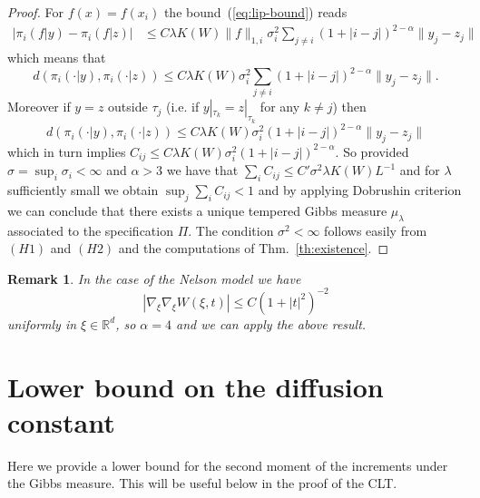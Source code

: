 \documentclass[a4paper,12pt,reqno]{amsart}
\newtheorem{remark}[theorem]{Remark}
\newcommand{\R}{\mathbb{R}}
\begin{document}
\begin{proof}
For $f(x) = f(x_i)$ the bound~(\ref{eq:lip-bound}) reads
\begin{equation*}
  \begin{split}
 \left|\pi_i(f|y)-\pi_i(f|z)\right| & \le 
 C \lambda K(W)  \|f\|_{1,i}  \sigma_i^2 \sum_{j \neq i} 
   (1+|i-j|)^{2-\alpha}  \|y_j-z_j\| 
  \end{split}
\end{equation*}
which means that
\begin{equation}
d(\pi_i(\cdot|y),\pi_i(\cdot|z)) \le C\lambda K(W)   \sigma_i^2   \sum_{j \neq i} 
   (1+|i-j|)^{2-\alpha}  \|y_j-z_j\|. 
\end{equation}
Moreover if $y=z$ outside $\tau_j$ (i.e. if $y|_{\tau_k} = z|_{\tau_k}$ for any $k \neq j$) then 
\begin{equation}
d(\pi_i(\cdot|y),\pi_i(\cdot|z)) \le C \lambda K(W) \sigma_i^2    
   (1+|i-j|)^{2-\alpha}  \|y_j-z_j\|  
\end{equation}
which in turn implies
$
C_{ij} \le C  \lambda K(W)  \sigma_i^2 
   (1+|i-j|)^{2-\alpha}.  
$
So provided 
$
\sigma = \sup_i \sigma_i < \infty 
$
and $\alpha > 3$
we have that $\sum_i C_{ij} \le C' \sigma^2 \lambda K(W) L^{-1}$ and for $\lambda$ sufficiently small we obtain $\sup_j \sum_{i} C_{ij} < 1$ and by applying Dobrushin criterion we can conclude that
 there exists a unique
tempered Gibbs measure $\mu_\lambda$ associated to the specification $\Pi$.
The condition $\sigma^2 < \infty$ follows easily from $(H1)$ and $(H2)$ and the computations of Thm.~\ref{th:existence}.
\end{proof}

\begin{remark}
In the case of the Nelson model we have
$$
|\nabla_\xi \nabla_\xi W(\xi,t)| \le C {(1+|t|^2)^{-2}}
$$  
uniformly in $\xi\in\R^d$, so $\alpha = 4$ and we can apply the above result.
\end{remark}


\section{Lower bound on the diffusion constant}
\label{sec:lower}

Here we provide a lower bound for the second moment of the increments under the Gibbs measure. This will be useful below in the proof of the CLT.
\end{document}
